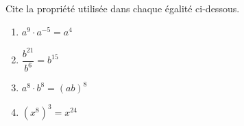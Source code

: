 %
%
  Cite la propriété utilisée dans chaque égalité ci-dessous.
  \begin{enumerate}[cols=2]
    \item $a^{9} \cdot a^{- 5} = a^{4}$
    \item $\dfrac{b^{21}}{b^{6}} = b^{15}$
    \item $a^{8} \cdot b^{8} = \left( ab \right)^{8}$
    \item $\left( x^{8} \right)^{3} = x^{24}$
  \end{enumerate}
